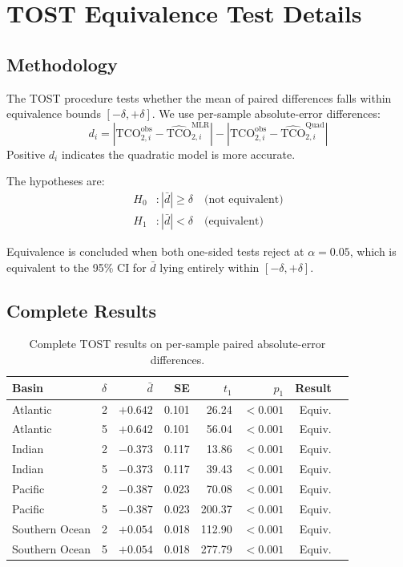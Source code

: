 \documentclass[12pt,a4paper]{article}
\begin{document}
\section{TOST Equivalence Test Details}

\subsection{Methodology}

The TOST procedure tests whether the mean of paired differences falls within equivalence bounds $[-\delta, +\delta]$. We use per-sample absolute-error differences:
\begin{equation*}
d_i = |\text{TCO}_{2,i}^{\text{obs}} - \hat{\text{TCO}}_{2,i}^{\text{MLR}}| - |\text{TCO}_{2,i}^{\text{obs}} - \hat{\text{TCO}}_{2,i}^{\text{Quad}}|
\end{equation*}
Positive $d_i$ indicates the quadratic model is more accurate.

The hypotheses are:
\begin{align*}
H_0&: |\bar{d}| \geq \delta \quad \text{(not equivalent)} \\
H_1&: |\bar{d}| < \delta \quad \text{(equivalent)}
\end{align*}

Equivalence is concluded when both one-sided tests reject at $\alpha = 0.05$, which is equivalent to the 95\% CI for $\bar{d}$ lying entirely within $[-\delta, +\delta]$.

\subsection{Complete Results}

\begin{table}[htbp]
\centering
\caption{Complete TOST results on per-sample paired absolute-error differences.}
\begin{tabular}{ll rrrr rl}
\toprule
\textbf{Basin} & $\delta$ & $\bar{d}$ & SE & $t_1$ & $p_1$ & Result \\
\midrule
Atlantic       & 2 & $+0.642$ & 0.101 & 26.24 & $<0.001$ & Equiv.\\
Atlantic       & 5 & $+0.642$ & 0.101 & 56.04 & $<0.001$ & Equiv.\\
Indian         & 2 & $-0.373$ & 0.117 & 13.86 & $<0.001$ & Equiv.\\
Indian         & 5 & $-0.373$ & 0.117 & 39.43 & $<0.001$ & Equiv.\\
Pacific        & 2 & $-0.387$ & 0.023 & 70.08 & $<0.001$ & Equiv.\\
Pacific        & 5 & $-0.387$ & 0.023 & 200.37 & $<0.001$ & Equiv.\\
Southern Ocean & 2 & $+0.054$ & 0.018 & 112.90 & $<0.001$ & Equiv.\\
Southern Ocean & 5 & $+0.054$ & 0.018 & 277.79 & $<0.001$ & Equiv.\\
\bottomrule
\end{tabular}
\end{table}
\end{document}
